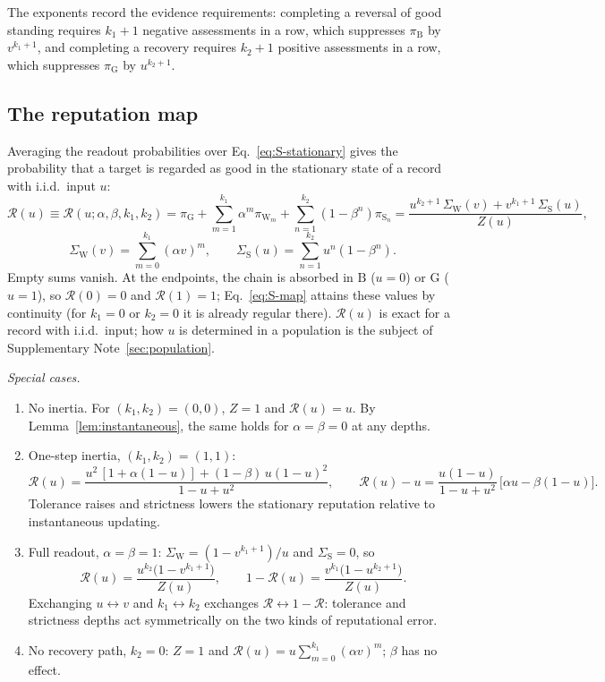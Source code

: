 \documentclass[fleqn,10pt]{article}
\theoremstyle{plain}
\theoremstyle{remark}
\newcommand{\Rm}{\mathcal R}
\newcommand{\G}{\mathrm G}
\newcommand{\B}{\mathrm B}
\newcommand{\W}{\mathrm W}
\renewcommand{\S}{\mathrm S}
\begin{document}
The exponents record the evidence requirements: completing a reversal of good
standing requires $k_1+1$ negative assessments in a row, which suppresses
$\pi_\B$ by $v^{k_1+1}$, and completing a recovery requires $k_2+1$ positive
assessments in a row, which suppresses $\pi_\G$ by $u^{k_2+1}$.

\subsection{The reputation map}
Averaging the readout probabilities over Eq.~\eqref{eq:S-stationary} gives the
probability that a target is regarded as good in the stationary state of a
record with i.i.d.\ input $u$:
\begin{equation}
\Rm(u)\equiv\Rm(u;\alpha,\beta,k_1,k_2)
=\pi_\G+\sum_{m=1}^{k_1}\alpha^m\pi_{\W_m}+\sum_{n=1}^{k_2}(1-\beta^n)\pi_{\S_n}
=\frac{u^{k_2+1}\,\Sigma_\W(v)+v^{k_1+1}\,\Sigma_\S(u)}{Z(u)},
\label{eq:S-map}
\end{equation}
\[
\Sigma_\W(v)=\sum_{m=0}^{k_1}(\alpha v)^m,\qquad
\Sigma_\S(u)=\sum_{n=1}^{k_2}u^n(1-\beta^n).
\]
Empty sums vanish. At the endpoints, the chain is absorbed in $\B$ ($u=0$) or
$\G$ ($u=1$), so $\Rm(0)=0$ and $\Rm(1)=1$; Eq.~\eqref{eq:S-map} attains these
values by continuity (for $k_1=0$ or $k_2=0$ it is already regular there).
$\Rm(u)$ is exact for a record with i.i.d.\ input; how $u$ is determined in a
population is the subject of Supplementary Note~\ref{sec:population}.

\textit{Special cases.}
\begin{enumerate}
\item No inertia. For $(k_1,k_2)=(0,0)$, $Z=1$ and $\Rm(u)=u$. By
Lemma~\ref{lem:instantaneous}, the same holds for $\alpha=\beta=0$ at any depths.
\item One-step inertia, $(k_1,k_2)=(1,1)$:
\begin{equation}
\Rm(u)=\frac{u^2\,[1+\alpha(1-u)]+(1-\beta)\,u(1-u)^2}{1-u+u^2},
\qquad
\Rm(u)-u=\frac{u(1-u)}{1-u+u^2}\,\bigl[\alpha u-\beta(1-u)\bigr].
\label{eq:S-onestep}
\end{equation}
Tolerance raises and strictness lowers the stationary reputation relative to
instantaneous updating.
\item Full readout, $\alpha=\beta=1$: $\Sigma_\W=(1-v^{k_1+1})/u$ and
$\Sigma_\S=0$, so
\begin{equation}
\Rm(u)=\frac{u^{k_2}\bigl(1-v^{k_1+1}\bigr)}{Z(u)},\qquad
1-\Rm(u)=\frac{v^{k_1}\bigl(1-u^{k_2+1}\bigr)}{Z(u)} .
\label{eq:S-full}
\end{equation}
Exchanging $u\leftrightarrow v$ and $k_1\leftrightarrow k_2$ exchanges
$\Rm\leftrightarrow1-\Rm$: tolerance and strictness depths act symmetrically on
the two kinds of reputational error.
\item No recovery path, $k_2=0$: $Z=1$ and
$\Rm(u)=u\sum_{m=0}^{k_1}(\alpha v)^m$; $\beta$ has no effect.
\end{enumerate}
\end{document}
